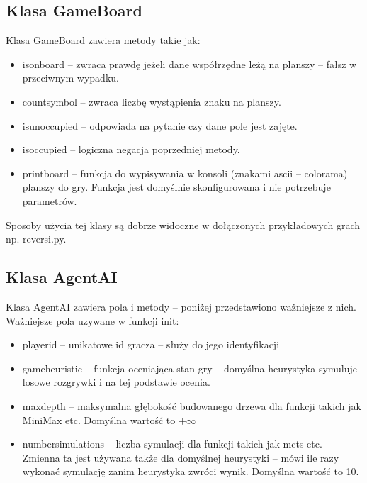 \documentclass[polish,shortabstract,inz]{iithesis}
\begin{document}
\subsection{Klasa GameBoard}
Klasa GameBoard zawiera metody takie jak:
\begin{itemize}
  \item is\textunderscore on\textunderscore board -- zwraca prawdę jeżeli dane współrzędne leżą na planszy -- fałsz w przeciwnym wypadku.
  \item count\textunderscore symbol -- zwraca liczbę wystąpienia znaku na planszy.
  \item is\textunderscore unoccupied -- odpowiada na pytanie czy dane pole jest zajęte.
  \item is\textunderscore occupied -- logiczna negacja poprzedniej metody.
  \item print\textunderscore board -- funkcja do wypisywania w konsoli (znakami ascii -- colorama) planszy do gry.
  Funkcja jest domyślnie skonfigurowana i nie potrzebuje parametrów.
\end{itemize}
Sposoby użycia tej klasy są dobrze widoczne w dołączonych przykładowych grach np. reversi.py.

\subsection{Klasa AgentAI}
Klasa AgentAI zawiera pola i metody -- poniżej przedstawiono ważniejsze z nich.
Ważniejsze pola uzywane w funkcji init:
\begin{itemize}
  \item player\textunderscore id -- unikatowe id gracza -- służy do jego identyfikacji
  \item game\textunderscore heuristic -- funkcja oceniająca stan gry -- domyślna heurystyka symuluje losowe rozgrywki i na tej podstawie ocenia.
  \item max\textunderscore depth -- maksymalna głębokość budowanego drzewa dla funkcji takich jak MiniMax etc. Domyślna wartość to \( +\infty \)
  \item number\textunderscore simulations -- liczba symulacji dla funkcji takich jak mcts etc. Zmienna ta jest używana także dla domyślnej heurystyki -- mówi ile razy wykonać symulację zanim heurystyka zwróci wynik. Domyślna wartość to 10.
\end{itemize}
\end{document}
